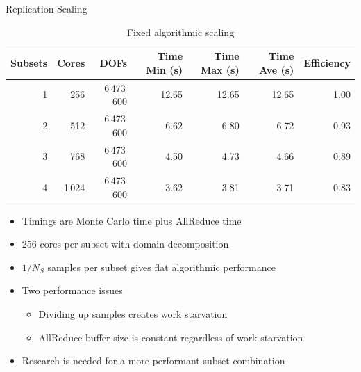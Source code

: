\documentclass{beamer}
\begin{document}
\begin{frame}{Replication Scaling}

  \begin{table}[htb!]
    \tiny
    \begin{center}
      \begin{tabular}{rrrrrrr}
        \toprule
        \multicolumn{1}{r}{Subsets} &
        \multicolumn{1}{r}{Cores} &
        \multicolumn{1}{r}{DOFs} &
        \multicolumn{1}{r}{Time Min (s)} &
        \multicolumn{1}{r}{Time Max (s)} &
        \multicolumn{1}{r}{Time Ave (s)} &
        \multicolumn{1}{r}{Efficiency}
        \\ \midrule
        1 & 256 & 6\,473\,600 & 12.65 & 12.65 & 12.65 & 1.00 \\
        2 & 512 & 6\,473\,600 & 6.62 & 6.80 & 6.72 & 0.93 \\
        3 & 768 & 6\,473\,600 & 4.50 & 4.73 & 4.66 & 0.89 \\
        4 & 1\,024 & 6\,473\,600 & 3.62 & 3.81 & 3.71 & 0.83 \\
        \bottomrule
      \end{tabular}
    \end{center}
    \caption{\small Fixed algorithmic scaling}
  \end{table}

  \vfill

  \begin{itemize}
    \small
  \item Timings are Monte Carlo time plus AllReduce time
  \item 256 cores per subset with domain decomposition
  \item $1/N_S$ samples per subset gives flat algorithmic performance
  \item Two performance issues
    \begin{itemize}
    \item Dividing up samples creates work starvation
    \item AllReduce buffer size is constant regardless of work starvation
    \end{itemize}
  \item Research is needed for a more performant subset combination
  \end{itemize}

\end{frame}

\end{document}
